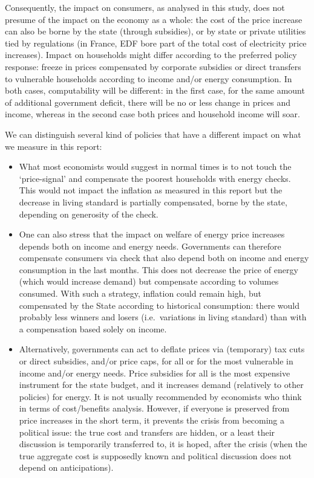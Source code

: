 \documentclass[
  9pt,
  a4paper,
  numbers=noendperiod,
  DIV=12]{scrartcl}
\begin{document}
Consequently, the impact on consumers, as analysed in this study, does
not presume of the impact on the economy as a whole: the cost of the
price increase can also be borne by the state (through subsidies), or by
state or private utilities tied by regulations (in France, EDF bore part
of the total cost of electricity price increases). Impact on households
might differ according to the preferred policy response: freeze in
prices compensated by corporate subsidies or direct transfers to
vulnerable households according to income and/or energy consumption. In
both cases, computability will be different: in the first case, for the
same amount of additional government deficit, there will be no or less
change in prices and income, whereas in the second case both prices and
household income will soar.

We can distinguish several kind of policies that have a different impact
on what we measure in this report:

\begin{itemize}
\item
  What most economists would suggest in normal times is to not touch the
  `price-signal' and compensate the poorest households with energy
  checks. This would not impact the inflation as measured in this report
  but the decrease in living standard is partially compensated, borne by
  the state, depending on generosity of the check.
\item
  One can also stress that the impact on welfare of energy price
  increases depends both on income and energy needs. Governments can
  therefore compensate consumers via check that also depend both on
  income and energy consumption in the last months. This does not
  decrease the price of energy (which would increase demand) but
  compensate according to volumes consumed. With such a strategy,
  inflation could remain high, but compensated by the State according to
  historical consumption: there would probably less winners and losers
  (i.e.~variations in living standard) than with a compensation based
  solely on income.
\item
  Alternatively, governments can act to deflate prices via (temporary)
  tax cuts or direct subsidies, and/or price caps, for all or for the
  most vulnerable in income and/or energy needs. Price subsidies for all
  is the most expensive instrument for the state budget, and it
  increases demand (relatively to other policies) for energy. It is not
  usually recommended by economists who think in terms of cost/benefits
  analysis. However, if everyone is preserved from price increases in
  the short term, it prevents the crisis from becoming a political
  issue: the true cost and transfers are hidden, or a least their
  discussion is temporarily transferred to, it is hoped, after the
  crisis (when the true aggregate cost is supposedly known and political
  discussion does not depend on anticipations).
\end{itemize}
\end{document}
